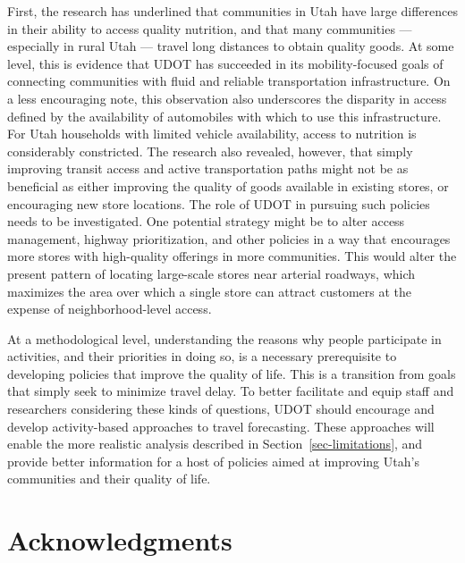 \documentclass[
  letterpaper,
  authoryear,
  review,
  3p]{elsarticle}
\begin{document}
First, the research has underlined that communities in Utah have large
differences in their ability to access quality nutrition, and that many
communities --- especially in rural Utah --- travel long distances to
obtain quality goods. At some level, this is evidence that UDOT has
succeeded in its mobility-focused goals of connecting communities with
fluid and reliable transportation infrastructure. On a less encouraging
note, this observation also underscores the disparity in access defined
by the availability of automobiles with which to use this
infrastructure. For Utah households with limited vehicle availability,
access to nutrition is considerably constricted. The research also
revealed, however, that simply improving transit access and active
transportation paths might not be as beneficial as either improving the
quality of goods available in existing stores, or encouraging new store
locations. The role of UDOT in pursuing such policies needs to be
investigated. One potential strategy might be to alter access
management, highway prioritization, and other policies in a way that
encourages more stores with high-quality offerings in more communities.
This would alter the present pattern of locating large-scale stores near
arterial roadways, which maximizes the area over which a single store
can attract customers at the expense of neighborhood-level access.

At a methodological level, understanding the reasons why people
participate in activities, and their priorities in doing so, is a
necessary prerequisite to developing policies that improve the quality
of life. This is a transition from goals that simply seek to minimize
travel delay. To better facilitate and equip staff and researchers
considering these kinds of questions, UDOT should encourage and develop
activity-based approaches to travel forecasting. These approaches will
enable the more realistic analysis described in
Section~\ref{sec-limitations}, and provide better information for a host
of policies aimed at improving Utah's communities and their quality of
life.


\hypertarget{acknowledgments}{%
\section*{Acknowledgments}\label{acknowledgments}}

\end{document}
